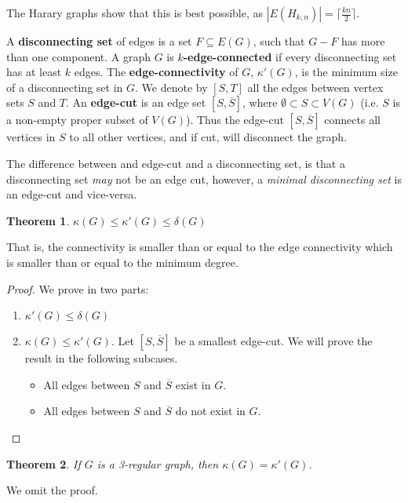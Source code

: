\documentclass{Book}
\newtheorem{theorem}{Theorem}
\begin{document}
The Harary graphs show that this is best possible, as $|E(H_{k,n})| = \lceil \frac{kn}{2}  \rceil$.

A \textbf{disconnecting set} of edges is a set $F \subseteq E(G)$, such that $G - F$ has more than one component. A graph $G$ is $k$\textbf{-edge-connected} if every disconnecting set has at least $k$ edges. The \textbf{edge-connectivity} of $G$, $\kappa'(G)$, is the minimum size of a disconnecting set in $G$. We denote by $[S, T]$ all the edges between vertex sets $S$ and $T$. An \textbf{edge-cut} is an edge set $[S, \overline{S}]$, where $\emptyset \subset S \subset V(G)$ (i.e. $S$ is a non-empty proper subset of $V(G)$). Thus the edge-cut $[S, \overline{S}]$ connects all vertices in $S$ to all other vertices, and if cut, will disconnect the graph.

The difference between and edge-cut and a disconnecting set, is that a disconnecting set \textit{may} not be an edge cut, however, a \textit{minimal disconnecting set} is an edge-cut and vice-versa.

\begin{theorem}
	\(\kappa(G) \le \kappa'(G) \le \delta(G)\)
\end{theorem}

That is, the connectivity is smaller than or equal to the edge connectivity which is smaller than or equal to the minimum degree.

\begin{proof}
	We prove in two parts:

	\begin{enumerate}
		\item \(\kappa'(G) \le \delta(G)\)
		\item \(\kappa(G) \le \kappa'(G)\). Let $[S, \overline{S}]$ be a smallest edge-cut. We will prove the result in the following subcases.
		      \begin{itemize}
			      \item All edges between $S$ and $\overline{S}$ exist in $G$.
			      \item All edges between $S$ and $\overline{S}$ do not exist in $G$.
		      \end{itemize}
	\end{enumerate}
\end{proof}


\begin{theorem}
	If $G$ is a 3-regular graph, then \(\kappa(G) = \kappa'(G)\).
\end{theorem}

We omit the proof.
\end{document}
